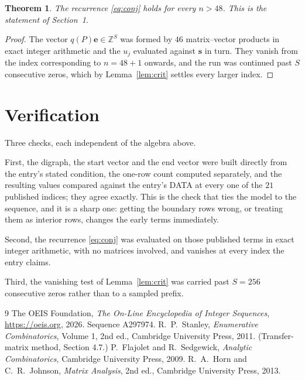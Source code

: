 \documentclass[11pt,a4paper]{article}
\theoremstyle{plain}
\newtheorem{theorem}{Theorem}
\theoremstyle{definition}
\begin{document}
\begin{theorem}
The recurrence \eqref{eq:conj} holds for every $n>48$. This is the statement of
Section~1.
\end{theorem}

\begin{proof}
The vector $q(P)\mathbf{e}\in\mathbb{Z}^{S}$ was formed by $46$ matrix--vector
products in exact integer arithmetic and the $u_j$ evaluated against $\mathbf{s}$ in turn.
They vanish from the index corresponding to $n=48+1$ onwards, and the run was continued
past $S$ consecutive zeros, which by Lemma~\ref{lem:crit} settles every larger index.
\end{proof}

\section{Verification}

Three checks, each independent of the algebra above.

First, the digraph, the start vector and the end vector were built directly from the
entry's stated condition, the one-row count computed separately, and the resulting values
compared against the entry's DATA at every one of the $21$ published indices; they
agree exactly. This is the check that ties the model to the sequence, and it is a sharp one:
getting the boundary rows wrong, or treating them as interior rows, changes the early terms
immediately.

Second, the recurrence \eqref{eq:conj} was evaluated on those published terms in exact
integer arithmetic, with no matrices involved, and vanishes at every index the entry claims.

Third, the vanishing test of Lemma~\ref{lem:crit} was carried past $S=256$ consecutive
zeros rather than to a sampled prefix.

\begin{thebibliography}{9}
 The OEIS Foundation, \emph{The On-Line Encyclopedia of Integer
Sequences}, \url{https://oeis.org}, 2026. Sequence A297974.
 R.~P.~Stanley, \emph{Enumerative Combinatorics}, Volume 1, 2nd ed.,
Cambridge University Press, 2011. (Transfer-matrix method, Section 4.7.)
 P.~Flajolet and R.~Sedgewick, \emph{Analytic Combinatorics}, Cambridge
University Press, 2009.
 R.~A.~Horn and C.~R.~Johnson, \emph{Matrix Analysis}, 2nd ed., Cambridge
University Press, 2013.
\end{thebibliography}
\end{document}
